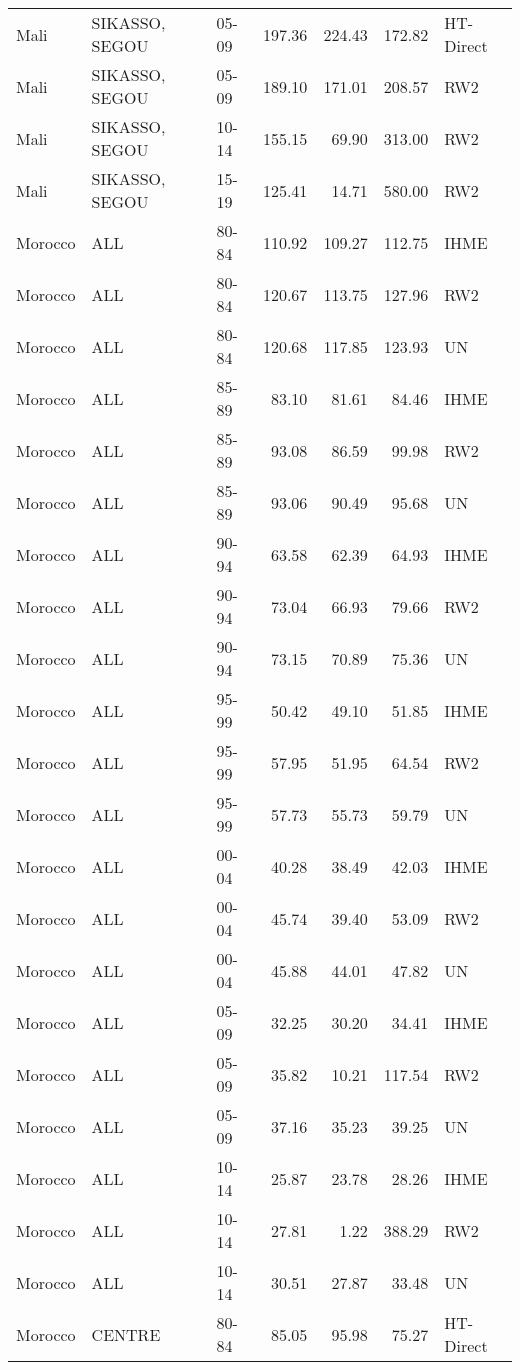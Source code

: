 \begin{longtable}{lllrrrl}
  Mali & SIKASSO, SEGOU & 05-09 & 197.36 & 224.43 & 172.82 & HT-Direct \\ 
  Mali & SIKASSO, SEGOU & 05-09 & 189.10 & 171.01 & 208.57 & RW2 \\ 
  Mali & SIKASSO, SEGOU & 10-14 & 155.15 & 69.90 & 313.00 & RW2 \\ 
  Mali & SIKASSO, SEGOU & 15-19 & 125.41 & 14.71 & 580.00 & RW2 \\ 
  Morocco & ALL & 80-84 & 110.92 & 109.27 & 112.75 & IHME \\ 
  Morocco & ALL & 80-84 & 120.67 & 113.75 & 127.96 & RW2 \\ 
  Morocco & ALL & 80-84 & 120.68 & 117.85 & 123.93 & UN \\ 
  Morocco & ALL & 85-89 & 83.10 & 81.61 & 84.46 & IHME \\ 
  Morocco & ALL & 85-89 & 93.08 & 86.59 & 99.98 & RW2 \\ 
  Morocco & ALL & 85-89 & 93.06 & 90.49 & 95.68 & UN \\ 
  Morocco & ALL & 90-94 & 63.58 & 62.39 & 64.93 & IHME \\ 
  Morocco & ALL & 90-94 & 73.04 & 66.93 & 79.66 & RW2 \\ 
  Morocco & ALL & 90-94 & 73.15 & 70.89 & 75.36 & UN \\ 
  Morocco & ALL & 95-99 & 50.42 & 49.10 & 51.85 & IHME \\ 
  Morocco & ALL & 95-99 & 57.95 & 51.95 & 64.54 & RW2 \\ 
  Morocco & ALL & 95-99 & 57.73 & 55.73 & 59.79 & UN \\ 
  Morocco & ALL & 00-04 & 40.28 & 38.49 & 42.03 & IHME \\ 
  Morocco & ALL & 00-04 & 45.74 & 39.40 & 53.09 & RW2 \\ 
  Morocco & ALL & 00-04 & 45.88 & 44.01 & 47.82 & UN \\ 
  Morocco & ALL & 05-09 & 32.25 & 30.20 & 34.41 & IHME \\ 
  Morocco & ALL & 05-09 & 35.82 & 10.21 & 117.54 & RW2 \\ 
  Morocco & ALL & 05-09 & 37.16 & 35.23 & 39.25 & UN \\ 
  Morocco & ALL & 10-14 & 25.87 & 23.78 & 28.26 & IHME \\ 
  Morocco & ALL & 10-14 & 27.81 & 1.22 & 388.29 & RW2 \\ 
  Morocco & ALL & 10-14 & 30.51 & 27.87 & 33.48 & UN \\ 
  Morocco & CENTRE & 80-84 & 85.05 & 95.98 & 75.27 & HT-Direct \\ 

\end{longtable}
